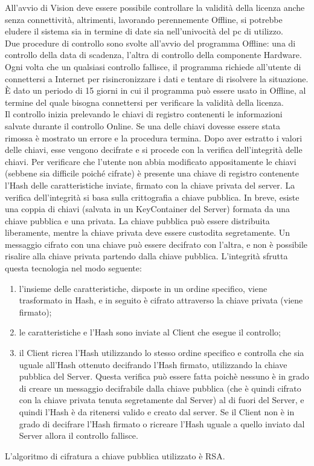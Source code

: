 All'avvio di Vision deve essere possibile controllare la validità della licenza anche senza connettività, altrimenti, lavorando perennemente Offline, si potrebbe eludere il sistema sia in termine di date sia nell'univocità del pc di utilizzo.\\
Due procedure di controllo sono svolte all'avvio del programma Offline: una di controllo della data di scadenza, l'altra di controllo della componente Hardware. Ogni volta che un qualsiasi controllo fallisce, il programma richiede all'utente di connettersi a Internet per risincronizzare i dati e tentare di risolvere la situazione. È dato un periodo di 15 giorni in cui il programma può essere usato in Offline, al termine del quale bisogna connettersi per verificare la validità della licenza.\\
Il controllo inizia prelevando le chiavi di registro contenenti le informazioni salvate durante il controllo Online. Se una delle chiavi dovesse essere stata rimossa è mostrato un errore e la procedura termina. Dopo aver estratto i valori delle chiavi, esse vengono decifrate e si procede con la verifica dell’integrità delle chiavi. Per verificare che l’utente non abbia modificato appositamente le chiavi (sebbene sia difficile poiché cifrate) è presente una chiave di registro contenente l’Hash delle caratteristiche inviate, firmato con la chiave privata del server.
La verifica dell'integrità si basa sulla crittografia a chiave pubblica. In breve, esiste una coppia di chiavi (salvata in un \gls{KeyContainer} del Server) formata da una chiave pubblica e una privata. La chiave pubblica può essere distribuita liberamente, mentre la chiave privata deve essere custodita segretamente. Un messaggio cifrato con una chiave può essere decifrato con l'altra, e non è possibile risalire alla chiave privata partendo dalla chiave pubblica. L'integrità sfrutta questa tecnologia nel modo seguente:
\begin{enumerate}
\item l'insieme delle caratteristiche, disposte in un ordine specifico, viene trasformato in Hash, e in seguito è cifrato attraverso la chiave privata (viene firmato);
\item le caratteristiche e l'Hash sono inviate al Client che esegue il controllo;
\item il Client ricrea l'Hash utilizzando lo stesso ordine specifico e controlla che sia uguale all'Hash ottenuto decifrando l'Hash firmato, utilizzando la chiave pubblica del Server. Questa verifica può essere fatta poichè nessuno è in grado di creare un messaggio decifrabile dalla chiave pubblica (che è quindi cifrato con la chiave privata tenuta segretamente dal Server) al di fuori del Server, e quindi l'Hash è da ritenersi valido e creato dal server. Se il Client non è in grado di decifrare l'Hash firmato o ricreare l'Hash uguale a quello inviato dal Server allora il controllo fallisce.
\end{enumerate}
L'algoritmo di cifratura a chiave pubblica utilizzato è \gls{RSA}.

